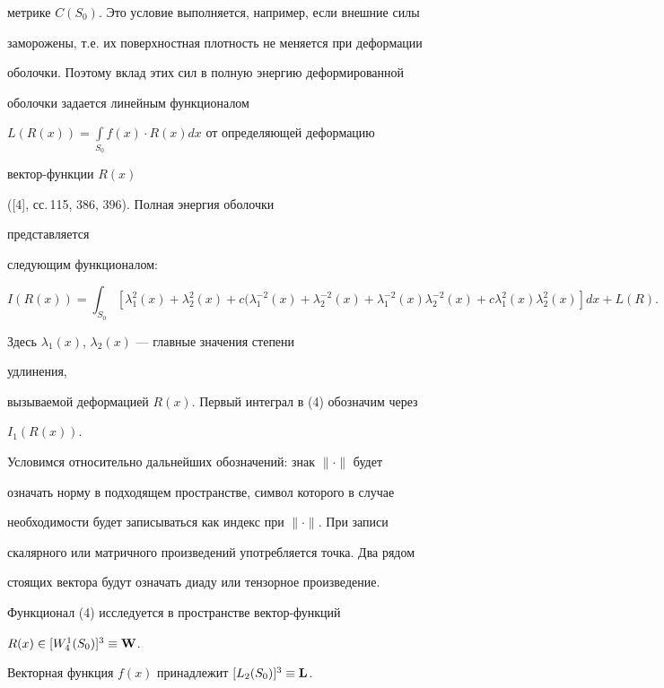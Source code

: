 метрике $C(S_0)$. Это условие выполняется, например, если внешние силы


заморожены, т.е. их поверхностная плотность не меняется при деформации


оболочки. Поэтому вклад этих сил в полную энергию деформированной


оболочки задается линейным функционалом


$L(R(x))=\int\limits_{S_0}f(x)\cdot R(x)dx$ от определяющей деформацию


вектор-функции $R(x)$


([4], сс.\,115, 386, 396). Полная энергия оболочки


представляется


следующим функционалом:


\begin{equation}


I(R(x))=\int_{S_0}[\lambda^2_1(x)+\lambda^2_2(x)+c


(\lambda^{-2}_1(x)+\lambda^{-2}_2(x)+


\lambda^{-2}_1(x)\lambda^{-2}_2(x)+


c\lambda^2_1(x)\lambda^2_2(x)]dx+L(R).


\end{equation}


Здесь $\lambda_1(x)$, $\lambda_2(x)$ --- главные значения степени


удлинения,


вызываемой деформацией $R(x)$. Первый интеграл в (4) обозначим через


$I_1(R(x))$.


Условимся относительно дальнейших обозначений: знак $\|\cdot\|$ будет


означать норму в подходящем пространстве, символ которого в случае


необходимости будет записываться как индекс при $\|\cdot\|$. При записи


скалярного или матричного произведений употребляется точка. Два рядом


стоящих вектора будут означать диаду или тензорное произведение.





Функционал (4) исследуется в пространстве вектор-функций


$R(x)\in[W^1_4(S_0)]^3\equiv\bold W$.


Векторная функция $f(x)$ принадлежит $[L_2(S_0)]^3\equiv\bold L$.





